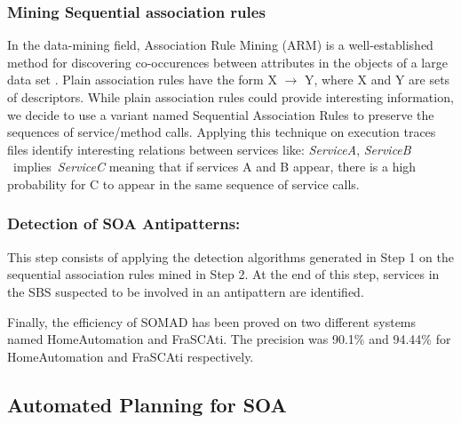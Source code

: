 \documentclass[lnbip]{svmultln}
\begin{document}

\subsubsection{Mining Sequential association rules}

In the data-mining field, Association Rule Mining (ARM) is a well-established method for discovering co-occurences between attributes in the objects of a large data set \cite{Gregory1991}. Plain association rules have the form X $\rightarrow$ Y, where X and Y are sets of descriptors. While plain association rules could provide interesting information, we decide to use a variant named Sequential Association Rules to preserve the sequences of service/method calls. Applying this technique on execution traces files identify interesting relations between services like: \textit{ServiceA}, \textit{ServiceB} \ implies\  \textit{ServiceC}
meaning that if services A and B appear, there is a high probability for C to appear in the same sequence of service calls.

\subsubsection{Detection of SOA Antipatterns:}

This step consists of applying the detection algorithms generated in Step 1 on the sequential association rules mined in Step 2. At the end of this step, services in the SBS suspected to be involved in an antipattern are identified.

Finally, the efficiency of SOMAD has been proved on two different systems named HomeAutomation and FraSCAti. The precision was 90.1\% and 94.44\% for HomeAutomation and FraSCAti respectively.

\subsection{Automated Planning for SOA}
\end{document}
